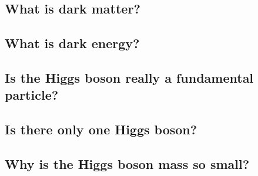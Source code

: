 \subsection{What is dark matter?}
\subsection{What is dark energy?}
\subsection{Is the Higgs boson really a fundamental particle?}
\subsection{Is there only one Higgs boson?}
\subsection{Why is the Higgs boson mass so small?}
